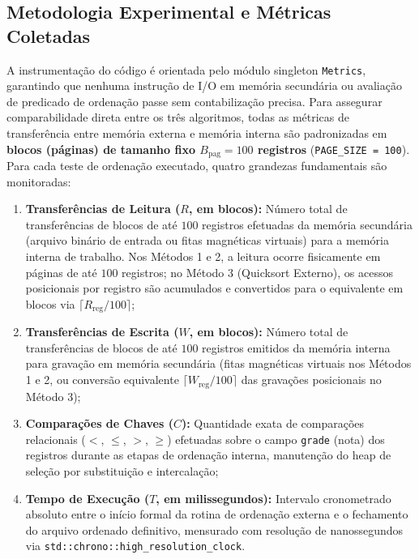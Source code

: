 \documentclass[12pt,a4paper]{article}
\begin{document}
\subsection{Metodologia Experimental e Métricas Coletadas}
A instrumentação do código é orientada pelo módulo singleton \texttt{Metrics}, garantindo que nenhuma instrução de I/O em memória secundária ou avaliação de predicado de ordenação passe sem contabilização precisa. Para assegurar comparabilidade direta entre os três algoritmos, todas as métricas de transferência entre memória externa e memória interna são padronizadas em \textbf{blocos (páginas) de tamanho fixo $B_{\text{pag}} = 100$ registros} (\texttt{PAGE\_SIZE = 100}). Para cada teste de ordenação executado, quatro grandezas fundamentais são monitoradas:
\begin{enumerate}
    \item \textbf{Transferências de Leitura ($R$, em blocos):} Número total de transferências de blocos de até $100$ registros efetuadas da memória secundária (arquivo binário de entrada ou fitas magnéticas virtuais) para a memória interna de trabalho. Nos Métodos 1 e 2, a leitura ocorre fisicamente em páginas de até $100$ registros; no Método 3 (Quicksort Externo), os acessos posicionais por registro são acumulados e convertidos para o equivalente em blocos via $\lceil R_{\text{reg}} / 100 \rceil$;
    \item \textbf{Transferências de Escrita ($W$, em blocos):} Número total de transferências de blocos de até $100$ registros emitidos da memória interna para gravação em memória secundária (fitas magnéticas virtuais nos Métodos 1 e 2, ou conversão equivalente $\lceil W_{\text{reg}} / 100 \rceil$ das gravações posicionais no Método 3);
    \item \textbf{Comparações de Chaves ($C$):} Quantidade exata de comparações relacionais ($<$, $\le$, $>$, $\ge$) efetuadas sobre o campo \texttt{grade} (nota) dos registros durante as etapas de ordenação interna, manutenção do heap de seleção por substituição e intercalação;
    \item \textbf{Tempo de Execução ($T$, em milissegundos):} Intervalo cronometrado absoluto entre o início formal da rotina de ordenação externa e o fechamento do arquivo ordenado definitivo, mensurado com resolução de nanossegundos via \texttt{std::chrono::}\allowbreak\texttt{high\_resolution\_clock}.
\end{enumerate}
\end{document}
